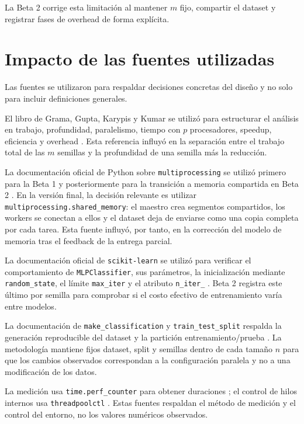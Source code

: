 \documentclass[11pt,a4paper]{article}
\begin{document}
La Beta 2 corrige esta limitación al mantener $m$ fijo, compartir el dataset y registrar
fases de overhead de forma explícita.


\section{Impacto de las fuentes utilizadas}

Las fuentes se utilizaron para respaldar decisiones concretas del diseño y no solo
para incluir definiciones generales.

El libro de Grama, Gupta, Karypis y Kumar se utilizó para estructurar el análisis en
trabajo, profundidad, paralelismo, tiempo con $p$ procesadores, speedup, eficiencia y
overhead \cite{grama2003}. Esta referencia influyó en la separación entre
el trabajo total de las $m$ semillas y la profundidad de una semilla más la reducción.

La documentación oficial de Python sobre \texttt{multiprocessing} se utilizó primero
para la Beta 1 y posteriormente para la transición a memoria compartida en Beta 2
\cite{pythonmultiprocessing,pythonsharedmemory}. En la versión final, la decisión relevante es utilizar
\texttt{multiprocessing.shared\_memory}: el maestro crea segmentos compartidos, los
workers se conectan a ellos y el dataset deja de enviarse como una copia completa por
cada tarea. Esta fuente influyó, por tanto, en la corrección del modelo de memoria tras
el feedback de la entrega parcial.

La documentación oficial de \texttt{scikit-learn} se utilizó para verificar el
comportamiento de \texttt{MLPClassifier}, sus parámetros, la inicialización mediante
\texttt{random\_state}, el límite \texttt{max\_iter} y el atributo
\texttt{n\_iter\_} \cite{sklearnmlp}. Beta 2 registra este último por semilla para
comprobar si el costo efectivo de entrenamiento varía entre modelos.

La documentación de \texttt{make\_classification} y \texttt{train\_test\_split}
respalda la generación reproducible del dataset y la partición entrenamiento/prueba
\cite{sklearnmakeclassification,sklearnmodelselection}. La metodología mantiene fijos
dataset, split y semillas dentro de cada tamaño $n$ para que los cambios observados
correspondan a la configuración paralela y no a una modificación de los datos.

La medición usa \texttt{time.perf\_counter} para obtener duraciones
\cite{pythontime}; el control de hilos internos usa \texttt{threadpoolctl}
\cite{threadpoolctl}. Estas fuentes respaldan el método de medición y el
control del entorno, no los valores numéricos observados.
\end{document}
